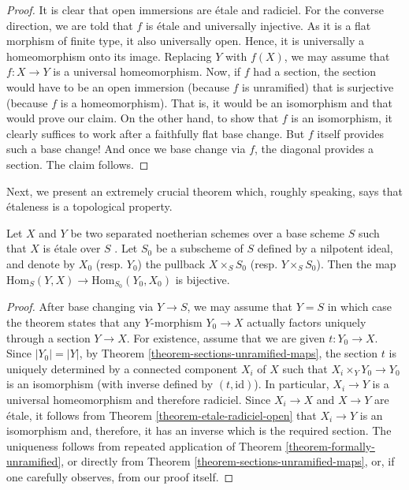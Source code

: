 \begin{proof}
It is clear that open immersions are \'etale and radiciel. For the converse
direction, we are told that $f$ is \'etale and universally injective. As it
is a flat morphism of finite type, it also universally open. Hence, it is
universally a homeomorphism onto its image. Replacing $Y$ with $f(X)$, we may
assume that $f:X \to Y$ is a universal homeomorphism.  Now, if $f$ had a 
section, the section would have to be an open immersion (because $f$ is 
unramified) that is surjective (because $f$ is a homeomorphism). That is, it 
would be an isomorphism and that would prove our claim. On the other hand, to 
show that $f$ is an isomorphism, it clearly suffices to work after a faithfully 
flat base change. But $f$ itself provides such a base change! And once we base
change via $f$, the diagonal provides a section. The claim follows.
\end{proof}

\noindent
Next, we present an extremely crucial theorem which, roughly speaking, says
that \'etaleness is a topological property. 

\begin{theorem}
\label{theorem-etale-topological}
Let $X$ and $Y$ be two separated noetherian schemes over a base scheme $S$
such that $X$ is \'etale over $S$ . Let $S_0$ be a subscheme of $S$ defined
by a nilpotent ideal, and denote by $X_0$ (resp. $Y_0$) the pullback
$X \times_S S_0$ (resp. $Y \times_S S_0$). Then the map
$\text{Hom}_S(Y,X) \to \text{Hom}_{S_0}(Y_0,X_0)$ is bijective. 
\end{theorem}

\begin{proof}
After base changing via $Y \to S$, we may assume that $Y = S$ in which case
the theorem states that any $Y$-morphism $Y_0 \to X$ actually factors
uniquely through a section $Y \to X$. For existence, assume that we are
given $t:Y_0 \to X$. Since $|Y_0| = |Y|$, by Theorem
\ref{theorem-sections-unramified-maps}, the section $t$ is uniquely
determined by a connected component $X_i$ of $X$ such that
$X_i \times_Y Y_0 \to Y_0$ is an isomorphism (with inverse defined by
$(t,\mathrm{id})$). In particular, $X_i \to Y$ is a universal homeomorphism
and therefore radiciel. Since $X_i \to X$ and $X \to Y$ are \'etale, it
follows from Theorem \ref{theorem-etale-radiciel-open} that $X_i \to Y$ is an
isomorphism and, therefore, it has an inverse which is the required section.
The uniqueness follows from repeated application of Theorem
\ref{theorem-formally-unramified}, or directly from Theorem
\ref{theorem-sections-unramified-maps}, or, if one carefully observes,
from our proof itself.
\end{proof}

